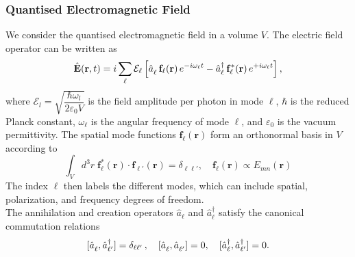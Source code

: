 \subsubsection{Quantised Electromagnetic Field}
We consider the quantised electromagnetic field in a volume $V$. The electric field operator can be written as  
\begin{equation}
\hat{\mathbf{E}}(\mathbf{r}, t) 
= i \sum_{\ell} \mathcal{E}_\ell 
\left[ \hat{a}^{\vphantom{\dagger}}_{\ell}\,\mathbf{f}_{\ell}(\mathbf{r})\,e^{-i\omega_{\ell} t} 
- \hat{a}_{\ell}^\dagger\,\mathbf{f}_{\ell}^*(\mathbf{r})\,e^{+i\omega_{\ell} t} \right],
\end{equation}
where   $\mathcal{E}_l = \sqrt{\dfrac{\hbar \omega_l}{2 \varepsilon_0 V}}$ is the field amplitude per photon in mode $\ell$, $\hbar$ is the reduced Planck constant, $\omega_\ell$ is the angular frequency of mode $\ell$, and $\varepsilon_0$ is the vacuum permittivity. The spatial mode functions $\mathbf{f}_{\ell}(\mathbf{r})$ form an orthonormal basis in $V$ according to  
\begin{equation*}
\int_V d^3r\; \mathbf{f}_{\ell}^*(\mathbf{r}) \cdot \mathbf{f}_{\ell'}(\mathbf{r}) 
= \delta_{\ell \ell'} , \quad \mathbf{f}_{\ell}(\mathbf{r}) \propto E_{mn}(\mathbf{r}) 
\end{equation*}
The index $\ell$ then labels the different modes, which can include spatial, polarization, and frequency degrees of freedom. \\

The annihilation and creation operators $\hat{a}_{\ell}$ and $\hat{a}_{\ell}^\dagger$ satisfy the canonical commutation relations  
\[
[\hat{a}_{\ell}^{\vphantom{\dagger}}, \hat{a}_{\ell'}^\dagger] = \delta_{\ell \ell'} \,, \quad
[\hat{a}_{\ell}^{\vphantom{\dagger}}, \hat{a}_{\ell'}^{\vphantom{\dagger}} ] = 0, \quad [\hat{a}_{\ell}^\dagger, \hat{a}_{\ell'}^\dagger] = 0. 
\]

